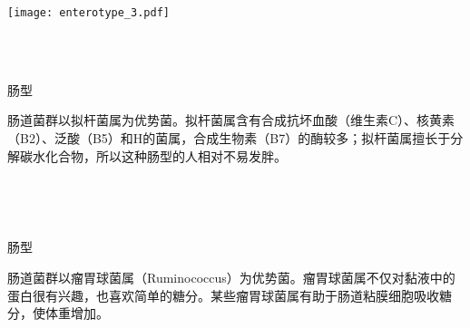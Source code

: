 \begin{center}
\noindent\centering\texttt{[image: enterotype\_3.pdf]}\\
\vspace*{10mm}
\noindent\fontsize{15pt}{11pt} \\
\end{center}
\vspace*{8mm}
\noindent\fontsize{10pt}{10pt}\selectfont {根据人体肠道菌的构成以及优势菌主要分为三种肠型，少数个体肠道菌肠型无法分类。 \\} 
\\
\vspace*{2mm}
\hspace*{-1mm}\parbox{\hsize}{
\noindent\fontsize{9pt}{10pt}\selectfont\color{gray2} {肠型 \\}
\vspace*{-2mm}
\begin{spacing}{1.5}
\noindent\fontsize{9pt}{10pt}\selectfont\color{gray2} {肠道菌群以拟杆菌属为优势菌。拟杆菌属含有合成抗坏血酸（维生素C）、核黄素（B2）、泛酸（B5）和H的菌属，合成生物素（B7）的酶较多；拟杆菌属擅长于分解碳水化合物，所以这种肠型的人相对不易发胖。 \\}
\end{spacing}
}
\\
\vspace*{2mm}
\hspace*{-1mm}\parbox{\hsize}{
\noindent\fontsize{9pt}{10pt}
\vspace*{-2mm}
\begin{spacing}{1.5}
\noindent\fontsize{9pt}{10pt}\selectfont {肠道菌群以普氏菌属（Prevotella）为优势菌。普氏菌属含有合成硫胺素和叶酸（B9）的菌类，合成硫胺素（维生素B1）的酶较多；普氏菌属的部分菌善于分解肠道黏蛋白。 \\}
\end{spacing} 
}
\\
\vspace*{2mm}
\hspace*{-1mm}\parbox{\hsize}{
\noindent\fontsize{9pt}{10pt}\selectfont\color{gray2} {肠型 \\}
\vspace*{-2mm}
\begin{spacing}{1.5}
\noindent\fontsize{9pt}{10pt}\selectfont\color{gray2} {肠道菌群以瘤胃球菌属（Ruminococcus）为优势菌。瘤胃球菌属不仅对黏液中的蛋白很有兴趣，也喜欢简单的糖分。某些瘤胃球菌属有助于肠道粘膜细胞吸收糖分，使体重增加。 \\}
\end{spacing}
}
\\

